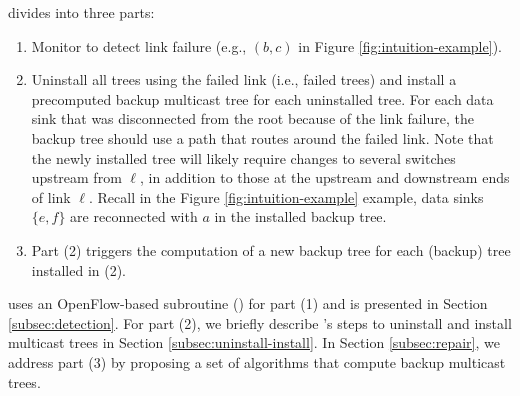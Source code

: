 \mdr divides into three parts: 
\begin{enumerate}
	\item Monitor to detect link failure (e.g., $(b,c)$ in Figure \ref{fig:intuition-example}).
	\item Uninstall all trees using the failed link (i.e., failed trees) and install a precomputed backup multicast tree for each uninstalled tree. 
	For each data sink that was disconnected from the root because of the link failure, the
	 backup tree should use a path that routes around the failed link. 
	 Note that the newly installed tree will likely require changes to several switches upstream from $\ell$, in addition to those at the upstream and downstream ends of link $\ell$.
	 Recall in the Figure \ref{fig:intuition-example} example, data sinks $\{e,f\}$ are reconnected with $a$ in the installed backup tree.

	
	\item Part (2) triggers the computation of a new backup tree for each (backup) tree installed in (2).  %
\end{enumerate}
\mdr uses an OpenFlow-based subroutine (\fls) for part (1) and is presented in Section \ref{subsec:detection}.  For part (2), we briefly describe \mdrs's steps to uninstall and install multicast trees in Section \ref{subsec:uninstall-install}. 
In Section \ref{subsec:repair}, we address part (3)  by proposing a set of algorithms that compute backup multicast trees. 



